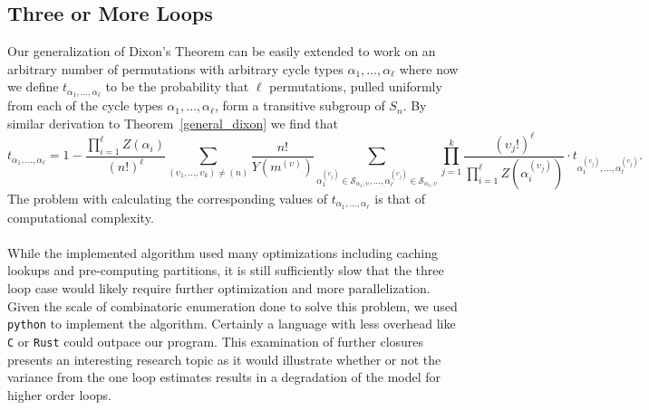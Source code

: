 \subsection{Three or More Loops}
Our generalization of Dixon's Theorem can be easily extended to work on an
arbitrary number of permutations with arbitrary cycle types
$\alpha_1,\dots,\alpha_\ell$ where now we define $t_{\alpha_1, \dots, \alpha_\ell}$ to be the probability that $\ell$ permutations, pulled uniformly from each of the cycle types $\alpha_1,\dots,\alpha_\ell$, form a transitive subgroup of $S_n$. 
By similar derivation to Theorem~\ref{general_dixon} we find that 
\[
  t_{\alpha_1, \dots, \alpha_\ell} = 1 - \frac{\prod_{i=1}^\ell
  Z(\alpha_i)}{(n!)^\ell} \sum_{(\upsilon_1,\dots,\upsilon_k)\ne(n)}
  \frac{n!}{Y(m^{(\upsilon)})} \sum_{\alpha_1^{(\upsilon_j)} \in
    \mathcal{S}_{\alpha_1, \upsilon},\dots,\alpha_\ell^{(\upsilon_j)}
  \in \mathcal{S}_{\alpha_\ell, \upsilon}} \prod_{j=1}^k
  \frac{(\upsilon_j!)^\ell}{\prod_{i=1}^\ell
  Z(\alpha_i^{(\upsilon_j)})} \cdot t_{\alpha_1^{(\upsilon_j)},
  \dots, \alpha_\ell^{(\upsilon_j)}}.
\]
The
problem with calculating the corresponding values of
$t_{\alpha_1,\dots,\alpha_\ell}$ is that of computational complexity.
\\\\While the implemented algorithm used many optimizations including
caching lookups and pre-computing partitions, it is still sufficiently
slow that the three loop case would likely require further
optimization and more parallelization. Given the scale of
combinatoric enumeration done to solve this problem, we used
\texttt{python} to implement the algorithm. Certainly a language with
less overhead like \texttt{C} or \texttt{Rust} could outpace our
program. This examination of further closures presents an interesting
research topic as it would illustrate whether or not the variance
from the one loop estimates results in a degradation of the model for
higher order loops.


